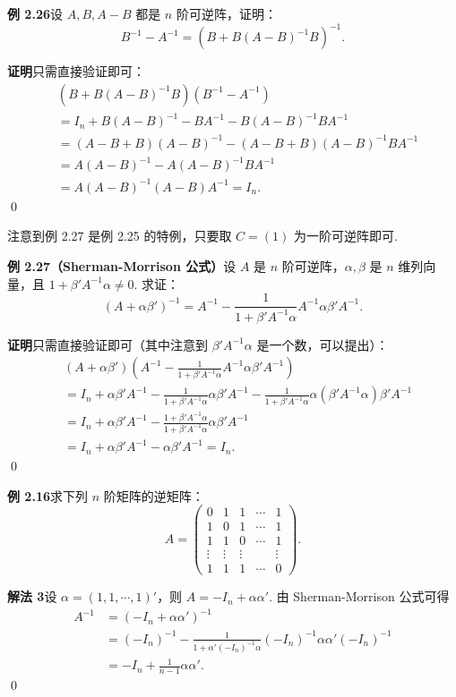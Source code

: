 \documentclass[UTF8, 12pt, fontset=fandol, oneside]{ctexart}
\begin{document}
\noindent\textbf{例 2.26}\quad 设 $A,B,A-B$ 都是 $n$ 阶可逆阵，证明：
\[
B^{-1}-A^{-1}=(B+B(A-B)^{-1}B)^{-1}.
\]

\noindent\textbf{证明}\quad 只需直接验证即可：
\[
\begin{aligned}
&(B+B(A-B)^{-1}B)(B^{-1}-A^{-1})\\
&=I_n+B(A-B)^{-1}-BA^{-1}-B(A-B)^{-1}BA^{-1}\\
&=(A-B+B)(A-B)^{-1}-(A-B+B)(A-B)^{-1}BA^{-1}\\
&=A(A-B)^{-1}-A(A-B)^{-1}BA^{-1}\\
&=A(A-B)^{-1}(A-B)A^{-1}=I_n.
\end{aligned}
\]
\qed

注意到例 2.27 是例 2.25 的特例，只要取 $C=(1)$ 为一阶可逆阵即可.

\noindent\textbf{例 2.27（Sherman-Morrison 公式）}\quad 设 $A$ 是 $n$ 阶可逆阵，$\alpha,\beta$ 是 $n$ 维列向量，且 $1+\beta'A^{-1}\alpha\ne0$. 求证：
\[
(A+\alpha\beta')^{-1}
=A^{-1}-\frac1{1+\beta'A^{-1}\alpha}A^{-1}\alpha\beta'A^{-1}.
\]

\noindent\textbf{证明}\quad 只需直接验证即可（其中注意到 $\beta'A^{-1}\alpha$ 是一个数，可以提出）：
\[
\begin{aligned}
&(A+\alpha\beta')\left(A^{-1}-\frac1{1+\beta'A^{-1}\alpha}A^{-1}\alpha\beta'A^{-1}\right)\\
&=I_n+\alpha\beta'A^{-1}
-\frac1{1+\beta'A^{-1}\alpha}\alpha\beta'A^{-1}
-\frac1{1+\beta'A^{-1}\alpha}\alpha(\beta'A^{-1}\alpha)\beta'A^{-1}\\
&=I_n+\alpha\beta'A^{-1}
-\frac{1+\beta'A^{-1}\alpha}{1+\beta'A^{-1}\alpha}\alpha\beta'A^{-1}\\
&=I_n+\alpha\beta'A^{-1}-\alpha\beta'A^{-1}=I_n.
\end{aligned}
\]
\qed

\noindent\textbf{例 2.16}\quad 求下列 $n$ 阶矩阵的逆矩阵：
\[
A=
\left(
\begin{array}{ccccc}
0 & 1 & 1 & \cdots & 1\\
1 & 0 & 1 & \cdots & 1\\
1 & 1 & 0 & \cdots & 1\\
\vdots & \vdots & \vdots & & \vdots\\
1 & 1 & 1 & \cdots & 0
\end{array}
\right).
\]

\noindent\textbf{解法 3}\quad 设 $\alpha=(1,1,\cdots,1)'$，则 $A=-I_n+\alpha\alpha'$. 由 Sherman-Morrison 公式可得
\[
\begin{aligned}
A^{-1}
&=(-I_n+\alpha\alpha')^{-1}\\
&=(-I_n)^{-1}
-\frac1{1+\alpha'(-I_n)^{-1}\alpha}(-I_n)^{-1}\alpha\alpha'(-I_n)^{-1}\\
&=-I_n+\frac1{n-1}\alpha\alpha'.
\end{aligned}
\]
\qed
\end{document}
